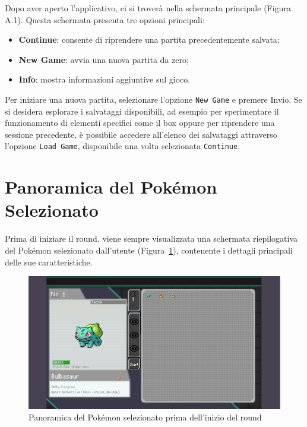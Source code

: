 \documentclass[a4paper,12pt]{report}
\begin{document}
{{Dopo aver aperto l’applicativo, ci si troverà nella schermata principale (Figura A.1).  
Questa schermata presenta tre opzioni principali:

\begin{itemize}
  \item \textbf{Continue}: consente di riprendere una partita precedentemente salvata;
  \item \textbf{New Game}: avvia una nuova partita da zero;
  \item \textbf{Info}: mostra informazioni aggiuntive sul gioco.
\end{itemize}

Per iniziare una nuova partita, selezionare l'opzione \texttt{New Game} e premere Invio.
Se si desidera esplorare i salvataggi disponibili, ad esempio per sperimentare il funzionamento di elementi specifici come il box oppure per riprendere una sessione precedente, è possibile accedere all’elenco dei salvataggi attraverso l’opzione \texttt{Load Game}, disponibile una volta selezionata \texttt{Continue}.

\section{Panoramica del Pokémon Selezionato}

Prima di iniziare il round, viene sempre visualizzata una schermata riepilogativa del Pokémon selezionato dall’utente (Figura~\ref{fig:pokemon_panorama}), contenente i dettagli principali delle sue caratteristiche.

\begin{figure}[H]
  \centering
  \includegraphics[width=\textwidth]{immagini/schermataBox.png}
  \caption{Panoramica del Pokémon selezionato prima dell’inizio del round}
  \label{fig:pokemon_panorama}
\end{figure}

}}
\end{document}

